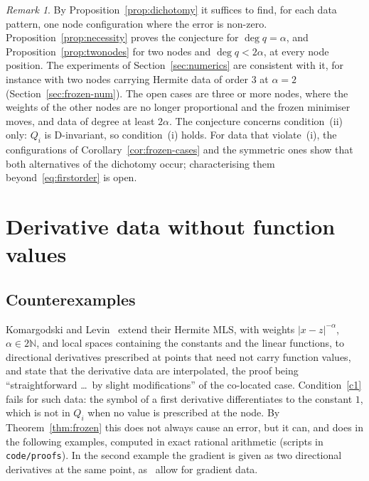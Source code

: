 \documentclass[12pt]{amsart}
\theoremstyle{definition}
\theoremstyle{remark}
\newtheorem{remark}[theorem]{Remark}
\newcommand{\N}{\mathbb{N}}
\begin{document}
\begin{remark}
By Proposition~\ref{prop:dichotomy} it suffices to find, for each data pattern, one node
configuration where the error is non-zero. Proposition~\ref{prop:necessity} proves the conjecture
for $\deg q=\alpha$, and Proposition~\ref{prop:twonodes} for two nodes and $\deg q<2\alpha$, at
every node position. The experiments of Section~\ref{sec:numerics} are consistent with it, for
instance with two nodes carrying Hermite data of order $3$ at $\alpha=2$
(Section~\ref{sec:frozen-num}). The open cases are three or more nodes, where the weights of the
other nodes are no longer proportional and the frozen minimiser moves, and data of degree at
least $2\alpha$. The conjecture concerns condition~(ii) only: $Q_i$ is D-invariant, so
condition~(i) holds. For data that violate~(i), the configurations of
Corollary~\ref{cor:frozen-cases} and the symmetric ones show that both alternatives of the
dichotomy occur; characterising them beyond~\eqref{eq:firstorder} is open.
\end{remark}

\section{Derivative data without function values}\label{sec:birkhoff}

\subsection{Counterexamples}
Komargodski and Levin~\cite[\S3]{KomargodskiLevin2006} extend their Hermite MLS, with weights
$|x-z|^{-\alpha}$, $\alpha\in2\N$, and local spaces containing the constants and the linear
functions, to directional derivatives prescribed at points that need not carry function values,
and state that the derivative data are interpolated, the proof being ``straightforward \dots\ by
slight modifications'' of the co-located case. Condition~\ref{c1} fails for such data: the
symbol of a first derivative differentiates to the constant $1$, which is not in $Q_i$ when no
value is prescribed at the node. By Theorem~\ref{thm:frozen} this does not always cause an
error, but it can, and does in the following examples, computed in exact rational arithmetic
(scripts in \texttt{code/proofs}). In the second example the gradient is given as two
directional derivatives at the same point, as~\cite[\S3]{KomargodskiLevin2006} allow for
gradient data.
\end{document}
